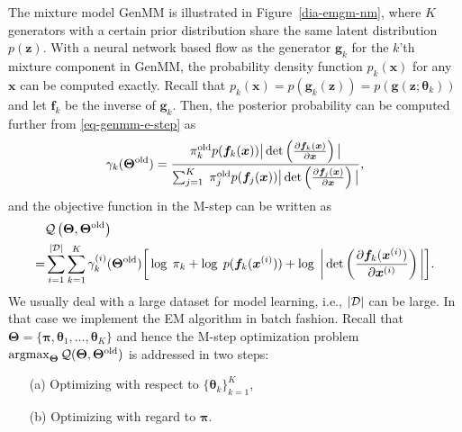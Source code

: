 The mixture model GenMM is illustrated in Figure~\ref{dia-emgm-nm},
where $K$ generators with a certain prior distribution share the same
latent distribution $p(\bm{z})$. With a neural network based flow as the generator $\bm{g}_k$ for the $k$'th mixture component in GenMM, the probability density function $p_k(\bm{x})$ for any
$\bm{x}$ can be computed exactly. Recall that $p_k(\bm{x}) =  p(\bm{g}_k(\bm{z})) =p(\bm{g}(\bm{z};\bm{\theta}_k))$ and let $\bm{f}_k$ be the inverse of $\bm{g}_k$. Then, the posterior probability can be computed further from \eqref{eq-genmm-e-step} as
\begin{align}\label{eq-genmm-gamma}
  \gamma_k({\bm{\Theta}}^{\mathrm{old}}) = \frac{\pi_k^{\mathrm{old}} p(\bm{f}_k(\bm{x})) \big|\det\left( \frac{ \partial \bm{f}_k(\bm{x})}{\partial \bm{x}} \right)\big|}{\sum_{j=1}^K\; \pi_j^{\mathrm{old}} p(\bm{f}_j(\bm{x})) \big|\det\left( \frac{ \partial \bm{f}_j(\bm{x})}{\partial \bm{x}} \right)\big|},
\end{align}
and the objective function in the M-step can be written as
\begin{align}\label{eq-genmm-obj}
  &\mathcal{Q}\left(\bm{\Theta},\bm{\Theta}^{\mathrm{old}}\right)  \nonumber\\
  =&\sum_{i=1}^{| \mathcal{D} |} \sum_{k=1}^{K}\gamma_k^{(i)}(\bm{\Theta}^{\mathrm{old}})\bigg[ \log\;\pi_k +\log\;p(\bm{f}_k(\bm{x}^{(i)})) + \log\;\bigg|\det\left(\frac{ \partial \bm{f}_k(\bm{x}^{(i)})}{\partial \bm{x}^{(i)}} \right)\bigg|\bigg].
\end{align}
We usually deal with a large dataset for model learning, i.e., $| \mathcal{D} |$ can be large. In that case we implement the EM algorithm in batch fashion. 
Recall that $ \bm{\Theta}= \{\bm{\pi},\bm{\theta}_1, \dots, \bm{\theta}_K \}$ and hence the M-step optimization problem $\operatorname{argmax}_{\bm{\Theta}} \mathcal{Q} (\bm{\Theta},\bm{\Theta}^{\mathrm{old}})$ is addressed in two steps:
\begin{itemize}
\item[(a)] Optimizing with respect to $\{ \bm{\theta}_k \}_{k=1}^{K}$,
\item[(b)] Optimizing with regard to $\bm{\pi}$.
\end{itemize}

